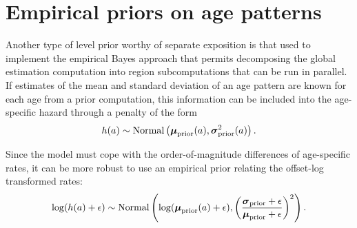 \section{Empirical priors on age patterns}
Another type of level prior worthy of separate exposition is that used
to implement the empirical Bayes approach that permits decomposing the
global estimation computation into region subcomputations that can be
run in parallel.  If estimates of the mean and standard deviation of
an age pattern are known for each age from a prior computation, this
information can be included into the age-specific hazard through a
penalty of the form
\[
h(a) \sim \operatorname{Normal}\left(\boldsymbol{\mu}_{\text{prior}}(a),
\boldsymbol{\sigma}_{\text{prior}}^2(a)\right).
\]

Since the model must cope with the order-of-magnitude differences of age-specific rates, it can be more robust to use an empirical prior relating the offset-log transformed rates:
\[
\log(h(a)+\epsilon) \sim \operatorname{Normal}\left(\log(\boldsymbol{\mu}_{\text{prior}}(a)+\epsilon),
\left(\frac{\boldsymbol{\sigma}_{\text{prior}}+\epsilon}{\boldsymbol{\mu}_{\text{prior}}+\epsilon}\right)^2\right).
\]
